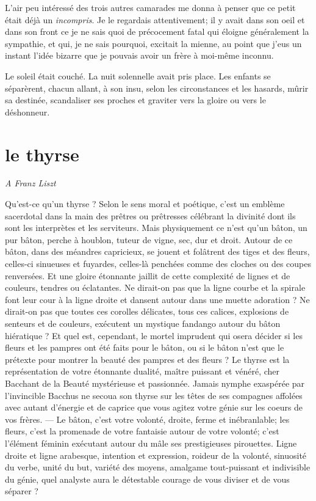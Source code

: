 L’air peu intéressé des trois autres camarades me donna
à penser que ce petit était déjà un \textit{incompris}. Je le regardais
attentivement; il y avait dans son oeil et dans son front ce je ne sais
quoi de précocement fatal qui éloigne généralement la sympathie, et
qui, je ne sais pourquoi, excitait la mienne, au point que
j’eus un instant l’idée bizarre que
je pouvais avoir un frère à moi{}-même inconnu.

Le soleil était couché. La nuit solennelle avait pris place. Les enfants
se séparèrent, chacun allant, à son insu, selon les circonstances et
les hasards, mûrir sa destinée, scandaliser ses proches et graviter
vers la gloire ou vers le déshonneur.


\quebra\section[Le thyrse]{le thyrse}
 
\begin{flushright}
\textit{A Franz Liszt}
\end{flushright}

Qu’est{}-ce qu’un thyrse ? Selon le
sens moral et poétique, c’est un emblème sacerdotal
dans la main des prêtres ou prêtresses célébrant la divinité dont ils
sont les interprètes et les serviteurs. Mais physiquement ce
n’est qu’un bâton, un pur bâton,
perche à houblon, tuteur de vigne, sec, dur et droit. Autour de ce
bâton, dans des méandres capricieux, se jouent et folâtrent des tiges
et des fleurs, celles{}-ci sinueuses et fuyardes, celles{}-là penchées
comme des cloches ou des coupes renversées. Et une gloire étonnante
jaillit de cette complexité de lignes et de couleurs, tendres ou
éclatantes. Ne dirait{}-on pas que la ligne courbe et la spirale font
leur cour à la ligne droite et dansent autour dans une muette adoration
? Ne dirait{}-on pas que toutes ces corolles délicates, tous ces
calices, explosions de senteurs et de couleurs, exécutent un mystique
fandango autour du bâton hiératique ? Et quel est, cependant, le mortel
imprudent qui osera décider si les fleurs et les pampres ont été faits
pour le bâton, ou si le bâton n’est que le prétexte
pour montrer la beauté des pampres et des fleurs ? Le thyrse est la
représentation de votre étonnante dualité, maître puissant et vénéré,
cher Bacchant de la Beauté mystérieuse et passionnée. Jamais nymphe
exaspérée par l’invincible Bacchus ne secoua son
thyrse sur les têtes de ses compagnes affolées avec autant
d’énergie et de caprice que vous agitez votre génie
sur les coeurs de vos frères. --- Le bâton, c’est votre
volonté, droite, ferme et inébranlable; les fleurs,
c’est la promenade de votre fantaisie autour de votre
volonté; c’est l’élément féminin
exécutant autour du mâle ses prestigieuses pirouettes. Ligne droite et
ligne arabesque, intention et expression, roideur de la volonté,
sinuosité du verbe, unité du but, variété des moyens, amalgame
tout{}-puissant et indivisible du génie, quel analyste aura le
détestable courage de vous diviser et de vous séparer ?

